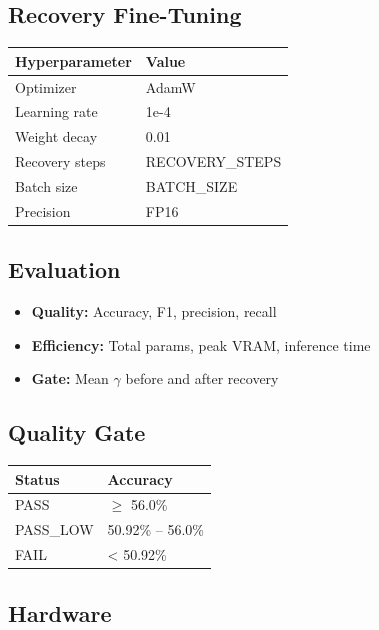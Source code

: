 \subsection{Recovery Fine-Tuning}

\begin{table}[H]
\centering
\small
\begin{tabular}{ll}
\toprule
\textbf{Hyperparameter} & \textbf{Value} \\
\midrule
Optimizer & AdamW \\
Learning rate & 1e-4 \\
Weight decay & 0.01 \\
Recovery steps & {{RECOVERY\_STEPS}} \\
Batch size & {{BATCH\_SIZE}} \\
Precision & FP16 \\
\bottomrule
\end{tabular}
\end{table}

\subsection{Evaluation}

\begin{itemize}
\item \textbf{Quality:} Accuracy, F1, precision, recall
\item \textbf{Efficiency:} Total params, peak VRAM, inference time
\item \textbf{Gate:} Mean $\gamma$ before and after recovery

\end{itemize}
\subsection{Quality Gate}

\begin{table}[H]
\centering
\small
\begin{tabular}{ll}
\toprule
\textbf{Status} & \textbf{Accuracy} \\
\midrule
PASS & $\ge$ 56.0\% \\
PASS\_LOW & 50.92\% -- 56.0\% \\
FAIL & < 50.92\% \\
\bottomrule
\end{tabular}
\end{table}

\subsection{Hardware}

